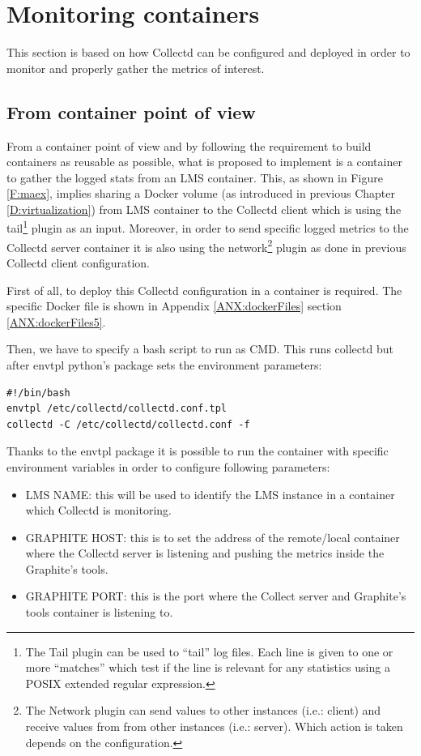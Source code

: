 \section{Monitoring containers}

This section is based on how Collectd can be configured and deployed in order to monitor and properly gather the metrics of interest.

\subsection{From container point of view}

From a container point of view and by following the requirement to build containers as reusable as possible, what is proposed to implement is a container to gather the logged stats from an LMS container. This, as shown in Figure \ref{F:maex}, implies sharing a Docker volume (as introduced in previous Chapter \ref{D:virtualization}) from LMS container to the Collectd client which is using the tail\footnote{The Tail plugin can be used to “tail” log files. Each line is given to one or more “matches” which test if the line is relevant for any statistics using a POSIX extended regular expression.} plugin as an input. Moreover, in order to send specific logged metrics to the Collectd server container it is also using the network\footnote{The Network plugin can send values to other instances (i.e.: client) and receive values from from other instances (i.e.: server). Which action is taken depends on the configuration.} plugin as done in previous Collectd client configuration.

First of all, to deploy this Collectd configuration in a container is required. The specific Docker file is shown in Appendix \ref{ANX:dockerFiles} section \ref{ANX:dockerFiles5}.

Then, we have to specify a bash script to run as CMD. This runs collectd but after envtpl python's package sets the environment parameters:
\begin{verbatim}
#!/bin/bash
envtpl /etc/collectd/collectd.conf.tpl
collectd -C /etc/collectd/collectd.conf -f
\end{verbatim}

Thanks to the envtpl package it is possible to run the container with specific environment variables in order to configure following parameters:

\begin{itemize}
\item LMS NAME: this will be used to identify the LMS instance in a container which Collectd is monitoring.
\item GRAPHITE HOST: this is to set the address of the remote/local container where the Collectd server is listening and pushing the metrics inside the Graphite's tools.
\item GRAPHITE PORT: this is the port where the Collect server and Graphite's tools container is listening to.
\end{itemize}

